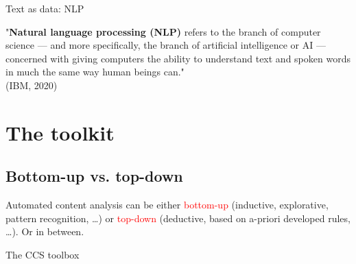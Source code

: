 \documentclass[handout]{beamer}
\begin{document}
\begin{frame}{Text as data: NLP}
	
	"\textbf{Natural language processing (NLP)} refers to the branch of computer science — and more specifically, the branch of artificial intelligence or AI — concerned with giving computers the ability to understand text and spoken words in much the same way human beings can."  \\
	\tiny{(IBM, 2020)}
\end{frame}

\section{The toolkit}
\subsection{Bottom-up vs. top-down}

\begin{frame}[standout]
	Automated content analysis can be either \textcolor{red}{bottom-up} (inductive, explorative, pattern recognition, \ldots) or \textcolor{red}{top-down} (deductive, based on a-priori developed rules, \ldots). Or in between.
\end{frame}

\begin{frame}{The CCS toolbox}
	\\
	\cite{Boumans2016}
\end{frame}
\end{document}

